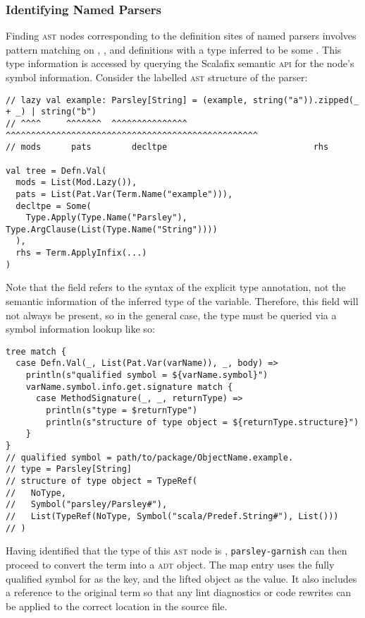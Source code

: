 \documentclass[../../main.tex]{subfiles}
\begin{document}
\subsubsection{Identifying Named Parsers}
Finding \textsc{ast} nodes corresponding to the definition sites of named parsers involves pattern matching on , , and  definitions with a type inferred to be some .
This type information is accessed by querying the Scalafix semantic \textsc{api} for the node's symbol information.
Consider the labelled \textsc{ast} structure of the  parser:
\begin{verbatim}
// lazy val example: Parsley[String] = (example, string("a")).zipped(_ + _) | string("b")
// ^^^^     ^^^^^^^  ^^^^^^^^^^^^^^^   ^^^^^^^^^^^^^^^^^^^^^^^^^^^^^^^^^^^^^^^^^^^^^^^^^^
// mods      pats        decltpe                             rhs

val tree = Defn.Val(
  mods = List(Mod.Lazy()),
  pats = List(Pat.Var(Term.Name("example"))),
  decltpe = Some(
    Type.Apply(Type.Name("Parsley"), Type.ArgClause(List(Type.Name("String"))))
  ),
  rhs = Term.ApplyInfix(...)
)
\end{verbatim}
%
Note that the \scala{decltpe} field refers to the syntax of the explicit type annotation, not the semantic information of the inferred type of the variable.
Therefore, this field will not always be present, so in the general case, the type must be queried via a symbol information lookup like so:
\begin{verbatim}
tree match {
  case Defn.Val(_, List(Pat.Var(varName)), _, body) =>
    println(s"qualified symbol = ${varName.symbol}")
    varName.symbol.info.get.signature match {
      case MethodSignature(_, _, returnType) =>
        println(s"type = $returnType")
        println(s"structure of type object = ${returnType.structure}")
    }
}  
// qualified symbol = path/to/package/ObjectName.example.
// type = Parsley[String]
// structure of type object = TypeRef(
//   NoType,
//   Symbol("parsley/Parsley#"),
//   List(TypeRef(NoType, Symbol("scala/Predef.String#"), List()))
// )
\end{verbatim}
Having identified that the type of this \textsc{ast} node is , \texttt{parsley-garnish} can then proceed to convert the  term into a  \textsc{adt} object.
The map entry uses the fully qualified symbol for \scala{example} as the key, and the lifted \scala{Parser} object as the value.
It also includes a reference to the original \scala{rhs} term so that any lint diagnostics or code rewrites can be applied to the correct location in the source file.

\end{document}
